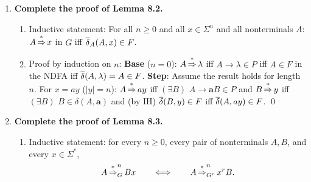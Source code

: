 \begin{enumerate}[{8.}1. ]
Let $A = \langle\Sigma,S,S_0,\delta,F\rangle$ be an NDFA without $\lambda$-transitions.

Add two new states $i$ and $f$, where $i$ will be the unique start state and
$f$ the unique final state.  Define
\[
A'=\langle\Sigma,S\cup\{i,f\},\{i\},\delta',\{f\}\rangle,
\]
where
\[
\delta'(s,\pmb{a})=\delta(s,\pmb{a})\qquad(s\in S,\ \pmb{a}\in\Sigma),
\]
\[
\delta'(i,\lambda)=S_0,
\]
and for every old final state $p\in F$ we add the $\lambda$-transition
\[
f\in\delta'(p,\lambda).
\]
There are no other new transitions.

Every accepting path of $A$ becomes an accepting path of $A'$ by first taking
a $\lambda$-move from $i$ to one of the states in the start set $S_0$, following
the old transitions of $A$, and then taking a final $\lambda$-move into $f$.
Conversely, any accepting path in $A'$ must begin with one of the
$\lambda$-moves from $i$ to a state in $S_0$, use only old transitions while
reading the input, and end with a $\lambda$-move from an old final state into
$f$.  Hence
\[
L(A')=L(A),
\]
and $A'$ has exactly one start state and exactly one final state.

\item \textbf{Complete the proof of Lemma 8.2.}

\begin{enumerate}
\item Inductive statement: For all $n \geq 0$ and all $x \in \Sigma^n$ and all nonterminals $A$: $A \operatorname{\overset{*}{\Rightarrow}} x$ in $G$ iff $\overline{\delta}_A(A, x) \in F$.

\item Proof by induction on $n$:
\textbf{Base} ($n=0$): $A \operatorname{\overset{*}{\Rightarrow}} \lambda$ iff $A \to \lambda \in P$ iff $A \in F$ in the NDFA iff $\overline{\delta}(A,\lambda) = A \in F$.
\textbf{Step}: Assume the result holds for length $n$. For $x = ay$ ($|y|=n$): $A \operatorname{\overset{*}{\Rightarrow}} ay$ iff $(\exists B)$ $A \to \pmb{a}B \in P$ and $B \operatorname{\overset{*}{\Rightarrow}} y$ iff $(\exists B)$ $B \in \delta(A,\pmb{a})$ and (by IH) $\overline{\delta}(B,y) \in F$ iff $\overline{\delta}(A,ay) \in F$. \qed
\end{enumerate}

\item \textbf{Complete the proof of Lemma 8.3.}

\begin{enumerate}
\item Inductive statement: for every $n\ge 0$, every pair of nonterminals
$A,B$, and every $x\in\Sigma^*$,
\[
A\operatorname{\overset{*}{\Rightarrow}}_G^{ n}Bx
\qquad\Longleftrightarrow\qquad
A\operatorname{\overset{*}{\Rightarrow}}_{G^r}^{ n}x^rB.
\]


\end{enumerate}
\end{enumerate}
